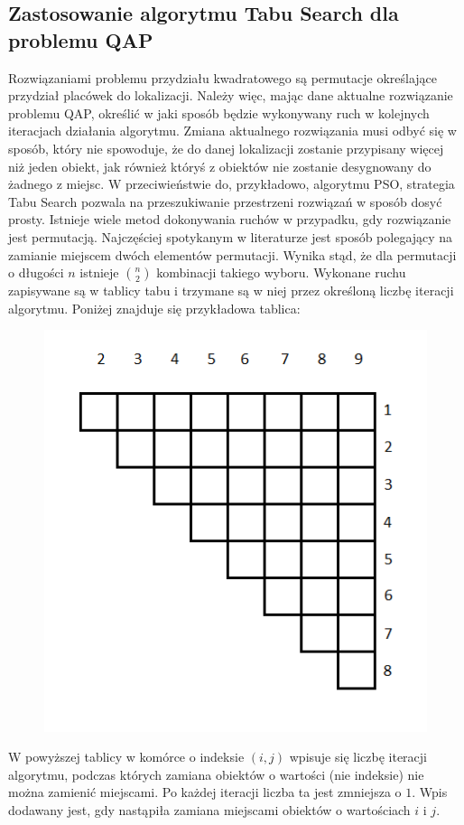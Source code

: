 \subsection{Zastosowanie algorytmu Tabu Search dla problemu QAP}
Rozwiązaniami problemu przydziału kwadratowego są permutacje określające przydział placówek do lokalizacji. Należy więc, mając dane aktualne rozwiązanie problemu QAP, określić w jaki sposób będzie wykonywany ruch w kolejnych iteracjach działania algorytmu. Zmiana aktualnego rozwiązania musi odbyć się w sposób, który nie spowoduje, że do danej lokalizacji zostanie przypisany więcej niż jeden obiekt, jak również któryś z obiektów nie zostanie desygnowany do żadnego z miejsc. W przeciwieństwie do, przykładowo, algorytmu PSO, strategia Tabu Search pozwala na przeszukiwanie przestrzeni rozwiązań w sposób dosyć prosty. Istnieje wiele metod dokonywania ruchów w przypadku, gdy rozwiązanie jest permutacją. Najczęściej spotykanym w literaturze jest sposób polegający na zamianie miejscem dwóch elementów permutacji. Wynika stąd, że dla permutacji o długości $n$ istnieje $n\choose 2$ kombinacji takiego wyboru. Wykonane ruchu zapisywane są w tablicy tabu i trzymane są w niej przez określoną liczbę iteracji algorytmu. Poniżej znajduje się przykładowa tablica:
\newpage
\begin{figure}[h]
\begin{center}
\includegraphics[scale=0.8]{tabu}
\end{center}
\end{figure}
W powyższej tablicy w komórce o indeksie $(i,j)$ wpisuje się liczbę iteracji algorytmu, podczas których zamiana obiektów o wartości (nie indeksie) nie można zamienić miejscami. Po każdej iteracji liczba ta jest zmniejsza o $1$. Wpis dodawany jest, gdy nastąpiła zamiana miejscami obiektów o wartościach $i$ i $j$.

